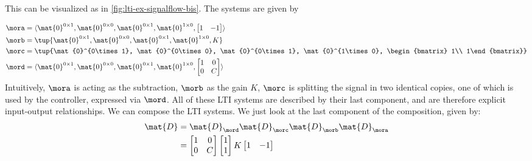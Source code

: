 {\begin{example}
        This can be visualized as in \cref{fig:lti-ex-signalflow-bis}.
        The systems are given by

        \begin{equation*}
            \begin{aligned}
                \mora & = \langle\mat{0}^{0\times 1}, \mat{0}^{0\times 0}, \mat{0}^{0\times 1}, \mat{0}^{1\times 0}, \begin{bmatrix} {1} & {-1}\end{bmatrix}\rangle \\
                \morb & =\tup{\mat{0}^{0\times 1}, \mat{0}^{0\times 0}, \mat{0}^{0\times 1}, \mat{0}^{1\times 0}, K} \\
                \morc & =\tup{\mat{0}^{0\times 1}, \mat{0}^{0\times 0}, \mat{0}^{0\times 1}, \mat{0}^{1\times 0}, \begin{bmatrix} 1\\ 1\end{bmatrix}} \\
                \mord & =\langle\mat{0}^{0\times 1}, \mat{0}^{0\times 0}, \mat{0}^{0\times 1}, \mat{0}^{1\times 0},
                \begin{bmatrix}
                    1 & 0 \\
                    0 & C
                \end{bmatrix}\rangle
            \end{aligned}
        \end{equation*}
        Intuitively, $\mora$ is acting as the subtraction, $\morb$ as the gain $K$, $\morc$ is splitting the signal in two identical copies, one of which is used by the controller, expressed via $\mord$.
        All of these LTI systems are described by their last component, and are therefore explicit input-output relationships.
        We can compose the LTI systems.
        We just look at the last component of the composition, given by:
        \begin{equation*}
            \begin{aligned}
                \mat{D} & =\mat{D}_\mord \mat{D}_\morc \mat{D}_\morb \mat{D}_\mora \\
                        & =\begin{bmatrix}1 & 0\\ 0 & {C}\end{bmatrix} \begin{bmatrix} 1\\ 1 \end{bmatrix} K \begin{bmatrix} 1 & -1 \end{bmatrix} \\

\end{aligned}
\end{equation*}
\end{example}}
